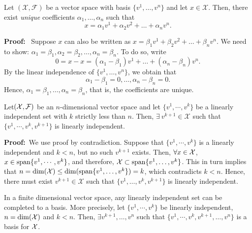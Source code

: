     
    
\begin{prop}
 Let $(\mathcal{X}, \mathcal{F})$ be a vector space with basis $\{v^1, \ldots, v^n\}$ and let $x\in\mathcal{X}$. Then, there exist \emph{unique} coefficients $\alpha_1, \ldots, \alpha_n$ such that $$x=\alpha_{1}v^{1}+\alpha_{2}v^{2}+\ldots+\alpha_{n}v^{n}.$$
\end{prop}

\textbf{Proof:}~ Suppose $x$ can also be written as $x=\beta_1v^1+\beta_2v^2+\ldots+\beta_nv^n$. We need to show: $\alpha_{1}=\beta_{1},\alpha_{2}=\beta_{2},\ldots,\alpha_{n}=\beta_{n}$. To do so, write
    \begin{equation*}
        0=x-x=(\alpha_{1}-\beta_{1})v^{1}+\ldots+(\alpha_{n}-\beta_{n})v^{n}.
    \end{equation*}
    By the linear independence of $\{v^{1}, \ldots, v^{n}\}$, we obtain that $$\alpha_{1}-\beta_{1}=0,\ldots, \alpha_{n}-\beta_{n}=0.$$
    Hence, $\alpha_1=\beta_1, \ldots, \alpha_n=\beta_n$, that is, the coefficients are unique. \Qed
    
    
    
\begin{prop}
Let$(\cal X, F)$ be an $n$-dimensional vector space and let $\{v^1, \cdots, v^k\}$ be a linearly independent set with $k$ strictly less than $n$. Then, $\exists~ v^{k+1} \in \mathcal{X} $ such that $\{v^1, \cdots, v^k, v^{k+1}\}$ is linearly independent.
\end{prop} 

\textbf{Proof:}~We use proof by contradiction. Suppose that $\{v^1, \cdots, v^k\}$ is a linearly independent and $k < n$, but no such $v^{k+1}$ exists. Then, $\forall x \in \cal X$, $x \in {\rm span} \{v^1, \cdots, v^k\}$, and therefore, ${\cal X} \subset {\rm span} \{v^1, \ldots, v^k\}$. This in turn implies that $n=\dim({\cal X}) \leq {\rm dim}({\rm span} \{v^1, \ldots, v^k\}) =k$, which contradicts $k<n$. Hence, there must exist $v^{k+1} \in \mathcal{X} $ such that $\{v^1, \ldots, v^k, v^{k+1}\}$ is linearly independent.
\Qed



\begin{cor}
\label{cor:Complete2Basis}
In a finite dimensional vector space, any linearly independent set can be completed to a basis. More precisely, let $\{v^1, \cdots, v^k\}$ be linearly independent, $n = \dim({\cal X})$ and $k<n$. Then, $\exists v^{k+1}, \ldots, v^n$ such that $\{v^1, \cdots, v^k, v^{k+1}, \ldots, v^n\}$ is a basis for $\cal X$.
\end{cor}

